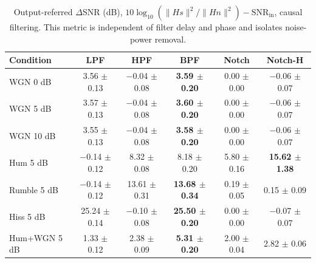 \begin{table}[!t]
\caption{Output-referred $\Delta$SNR (dB), $10\log_{10}(\|Hs\|^2/\|Hn\|^2)-\mathrm{SNR_{in}}$, causal filtering. This metric is independent of filter delay and phase and isolates noise-power removal.}
\label{tab:dsnr_oref}
\centering\footnotesize
\begin{tabular}{lccccc}
\hline
Condition & LPF & HPF & BPF & Notch & Notch-H \\ \hline
WGN 0 dB & 3.56 $\pm$ 0.13 & $-$0.04 $\pm$ 0.08 & \textbf{3.59 $\pm$ 0.20} & 0.00 $\pm$ 0.00 & $-$0.06 $\pm$ 0.07 \\
WGN 5 dB & 3.57 $\pm$ 0.13 & $-$0.04 $\pm$ 0.08 & \textbf{3.60 $\pm$ 0.20} & 0.00 $\pm$ 0.00 & $-$0.06 $\pm$ 0.07 \\
WGN 10 dB & 3.55 $\pm$ 0.13 & $-$0.04 $\pm$ 0.08 & \textbf{3.58 $\pm$ 0.20} & 0.00 $\pm$ 0.00 & $-$0.06 $\pm$ 0.07 \\
Hum 5 dB & $-$0.14 $\pm$ 0.12 & 8.32 $\pm$ 0.08 & 8.18 $\pm$ 0.20 & 5.80 $\pm$ 0.16 & \textbf{15.62 $\pm$ 1.38} \\
Rumble 5 dB & $-$0.14 $\pm$ 0.12 & 13.61 $\pm$ 0.31 & \textbf{13.68 $\pm$ 0.34} & 0.19 $\pm$ 0.05 & 0.15 $\pm$ 0.09 \\
Hiss 5 dB & 25.24 $\pm$ 0.14 & $-$0.10 $\pm$ 0.08 & \textbf{25.50 $\pm$ 0.20} & 0.00 $\pm$ 0.00 & $-$0.07 $\pm$ 0.07 \\
Hum+WGN 5 dB & 1.33 $\pm$ 0.12 & 2.38 $\pm$ 0.09 & \textbf{5.31 $\pm$ 0.20} & 2.00 $\pm$ 0.04 & 2.82 $\pm$ 0.06 \\
\hline
\end{tabular}

\end{table}